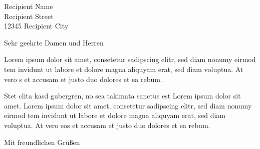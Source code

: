 
\begin{letter}{Recipient Name\\ Recipient Street\\ 12345 Recipient City}

\opening{Sehr geehrte Damen und Herren}

Lorem ipsum dolor sit amet, consetetur sadipscing elitr, sed diam nonumy eirmod
tem invidunt ut labore et dolore magna aliquyam erat, sed diam voluptua. At vero
s et accusam et justo duo dolores et ea rebum. 

Stet clita kasd gubergren, no sea takimata sanctus est Lorem ipsum dolor sit
amet. Lorem ipsum dolor sit amet, consetetur sadipscing elitr, sed diam nonumy
eirmod tem invidunt ut labore et dolore magna aliquyam erat, sed diam voluptua.
At vero eos et accusam et justo duo dolores et ea rebum. 

\closing{Mit freundlichen Grüßen}

\end{letter}

